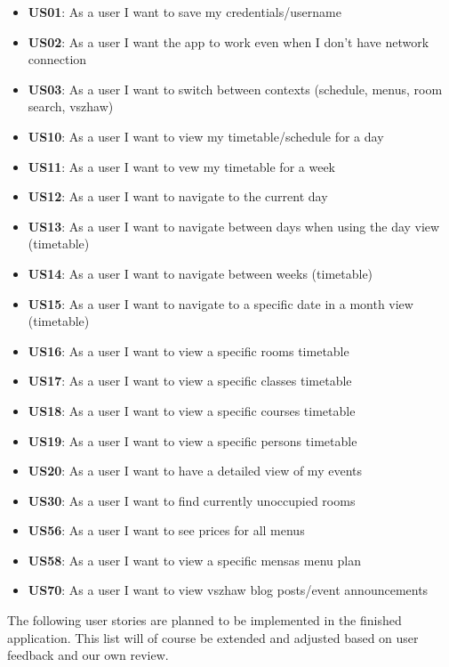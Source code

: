 \begin{markdown}
\begin{itemize}
  \item \textbf{US01}: As a user I want to save my credentials/username
  \item \textbf{US02}: As a user I want the app to work even when I don't have network connection
  \item \textbf{US03}: As a user I want to switch between contexts (schedule, menus, room search, vszhaw)
  \item \textbf{US10}: As a user I want to view my timetable/schedule for a day
  \item \textbf{US11}: As a user I want to vew my timetable for a week
  \item \textbf{US12}: As a user I want to navigate to the current day
  \item \textbf{US13}: As a user I want to navigate between days when using the day view (timetable)
  \item \textbf{US14}: As a user I want to navigate between weeks (timetable)
  \item \textbf{US15}: As a user I want to navigate to a specific date in a month view (timetable)
  \item \textbf{US16}: As a user I want to view a specific rooms timetable
  \item \textbf{US17}: As a user I want to view a specific classes timetable
  \item \textbf{US18}: As a user I want to view a specific courses timetable
  \item \textbf{US19}: As a user I want to view a specific persons timetable
  \item \textbf{US20}: As a user I want to have a detailed view of my events
  \item \textbf{US30}: As a user I want to find currently unoccupied rooms
  \item \textbf{US56}: As a user I want to see prices for all menus
  \item \textbf{US58}: As a user I want to view a specific mensas menu plan
  \item \textbf{US70}: As a user I want to view vszhaw blog posts/event announcements
\end{itemize}

\newpage

The following user stories are planned to be implemented in the finished application. This list will of course be extended and adjusted based on user feedback and our own review.


\end{markdown}

